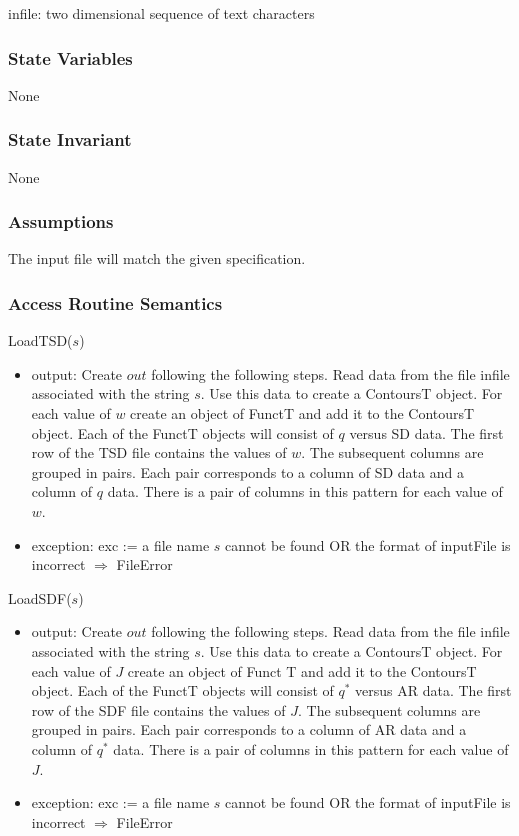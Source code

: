 \documentclass[12pt, titlepage]{article}
\begin{document}
infile: two dimensional sequence of text characters

\subsubsection {State Variables}

None

\subsubsection {State Invariant}

None

\subsubsection {Assumptions}

The input file will match the given specification.

\subsubsection {Access Routine Semantics}

\noindent LoadTSD($s$)
\begin{itemize}
\item output: Create $out$ following the following steps.  Read data from the
  file infile associated with the string $s$.  Use this data to create a ContoursT
  object.  For each value of $w$ create an object of FunctT and add it to the
  ContoursT object.  Each of the FunctT objects will consist of $q$ versus SD
  data.  The first row of the TSD file contains the values of $w$.  The
  subsequent columns are grouped in pairs.  Each pair corresponds to a column of
  SD data and a column of $q$ data.  There is a pair of columns in this pattern
  for each value of $w$.\\

\item exception: exc := a file name $s$ cannot be found OR the format of
  inputFile is incorrect $\Rightarrow$  FileError
\end{itemize}

\noindent LoadSDF($s$)
\begin{itemize}
\item output: Create $out$ following the following steps.  Read data from the
  file infile associated with the string $s$.  Use this data to create a ContoursT
  object.  For each value of $J$ create an object of Funct T and add it to the
  ContoursT object.  Each of the FunctT objects will consist of $q^*$ versus AR
  data.  The first row of the SDF file contains the values of $J$.  The
  subsequent columns are grouped in pairs.  Each pair corresponds to a column of
  AR data and a column of $q^*$ data.  There
  is a pair of columns in this pattern for each value of $J$.\\
\item exception: exc := a file name $s$ cannot be found OR the format of
  inputFile is incorrect $\Rightarrow$  FileError
\end{itemize}
\end{document}
